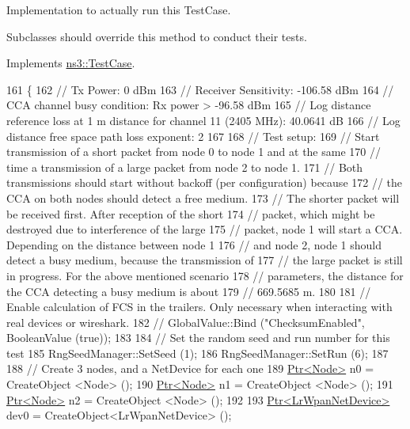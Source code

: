 Implementation to actually run this Test\+Case. 

Subclasses should override this method to conduct their tests. 

Implements \hyperlink{classns3_1_1TestCase_a8ff74680cf017ed42011e4be51917a24}{ns3\+::\+Test\+Case}.


\begin{DoxyCode}
161 \{
162   \textcolor{comment}{// Tx Power: 0 dBm}
163   \textcolor{comment}{// Receiver Sensitivity: -106.58 dBm}
164   \textcolor{comment}{// CCA channel busy condition: Rx power > -96.58 dBm}
165   \textcolor{comment}{// Log distance reference loss at 1 m distance for channel 11 (2405 MHz): 40.0641 dB}
166   \textcolor{comment}{// Log distance free space path loss exponent: 2}
167 
168   \textcolor{comment}{// Test setup:}
169   \textcolor{comment}{// Start transmission of a short packet from node 0 to node 1 and at the same}
170   \textcolor{comment}{// time a transmission of a large packet from node 2 to node 1.}
171   \textcolor{comment}{// Both transmissions should start without backoff (per configuration) because}
172   \textcolor{comment}{// the CCA on both nodes should detect a free medium.}
173   \textcolor{comment}{// The shorter packet will be received first. After reception of the short}
174   \textcolor{comment}{// packet, which might be destroyed due to interference of the large}
175   \textcolor{comment}{// packet, node 1 will start a CCA. Depending on the distance between node 1}
176   \textcolor{comment}{// and node 2, node 1 should detect a busy medium, because the transmission of}
177   \textcolor{comment}{// the large packet is still in progress. For the above mentioned scenario}
178   \textcolor{comment}{// parameters, the distance for the CCA detecting a busy medium is about}
179   \textcolor{comment}{// 669.5685 m.}
180 
181   \textcolor{comment}{// Enable calculation of FCS in the trailers. Only necessary when interacting with real devices or
       wireshark.}
182   \textcolor{comment}{// GlobalValue::Bind ("ChecksumEnabled", BooleanValue (true));}
183 
184   \textcolor{comment}{// Set the random seed and run number for this test}
185   RngSeedManager::SetSeed (1);
186   RngSeedManager::SetRun (6);
187 
188   \textcolor{comment}{// Create 3 nodes, and a NetDevice for each one}
189   \hyperlink{classns3_1_1Ptr}{Ptr<Node>} n0 = CreateObject <Node> ();
190   \hyperlink{classns3_1_1Ptr}{Ptr<Node>} n1 = CreateObject <Node> ();
191   \hyperlink{classns3_1_1Ptr}{Ptr<Node>} n2 = CreateObject <Node> ();
192 
193   \hyperlink{classns3_1_1Ptr}{Ptr<LrWpanNetDevice>} dev0 = CreateObject<LrWpanNetDevice> ();

\end{DoxyCode}
